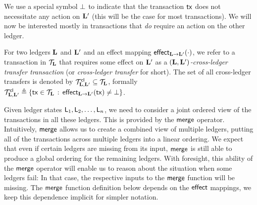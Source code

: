 We use a special symbol $\noeffect$ to indicate that the transaction $\tx$ does
not necessitate any action on $\Ledger'$ (this will be the case for most
transactions).
We will now be interested mostly in transactions that \emph{do}
require an action on the other ledger.

\begin{definition}
For two ledgers $\Ledger$ and $\Ledger'$ and an effect mapping
$\eff{\Ledger}{\Ledger'}(\cdot)$, we refer to a transaction in
$\Trans_\Ledger$ that requires some effect on $\Ledger'$ as
a \emph{$(\Ledger,\Ledger')$-cross-ledger transfer
transaction} (or \emph{cross-ledger transfer} for short).
The set of all cross-ledger transfers is denoted by
  $\Trans_{\Ledger,\Ledger'}^\cl\subseteq\Trans_\Ledger$,
formally
$
  \Trans_{\Ledger,\Ledger'}^\cl
\defeq
\setd
  {\tx \in \Trans_\Ledger}
  {\eff{\Ledger}{\Ledger'}(\tx)\neq\noeffect}
$.
\end{definition}

Given ledger states $\LState_1, \LState_2, \ldots,\LState_n$, we need to
consider a joint ordered view of the transactions in all these ledgers. This is provided
by the  $\merge$ operator. Intuitively, $\merge$  allows us to
create a combined view of multiple ledgers, putting all of the transactions
across multiple ledgers into a linear ordering.
We expect that even if certain ledgers are missing from its input,
$\merge$ is still able to produce a global ordering for the remaining ledgers.
With foresight, this ability of the $\merge$ operator will enable us to reason
about the
situation
when some ledgers fail: In that case, the respective
inputs to the $\merge$ function will be missing. The $\merge$ function
definition below depends on the $\effect$ mappings, we keep this dependence
implicit for simpler notation.

